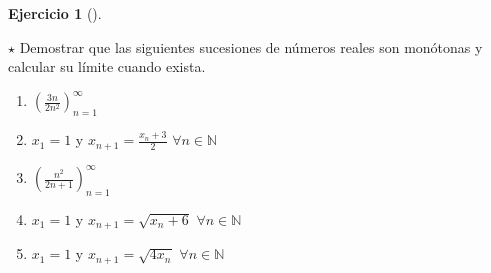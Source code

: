 \documentclass[
  a4paper,
]{scrreport}
\theoremstyle{definition}
\newtheorem{exercise}{Ejercicio}[chapter]
\theoremstyle{remark}
\begin{document}
\begin{exercise}[]\protect\hypertarget{exr-sucesiones-monotonas}{}\label{exr-sucesiones-monotonas}

\(\star\) Demostrar que las siguientes sucesiones de números reales son
monótonas y calcular su límite cuando exista.

\begin{enumerate}
\def\labelenumi{\alph{enumi}.}
\item
  \(\left(\frac{3n}{2n^2}\right)_{n=1}^\infty\)
\item
  \(x_1=1\) y \(x_{n+1}=\frac{x_n+3}{2}\) \(\forall n \in \mathbb{N}\)
\item
  \(\left(\frac{n^2}{2n+1}\right)_{n=1}^\infty\)
\item
  \(x_1=1\) y \(x_{n+1}=\sqrt{x_n+6}\) \(\forall n\in \mathbb{N}\)
\item
  \(x_1=1\) y \(x_{n+1}=\sqrt{4x_n}\) \(\forall n\in\mathbb{N}\)
\end{enumerate}

\end{exercise}
\end{document}
